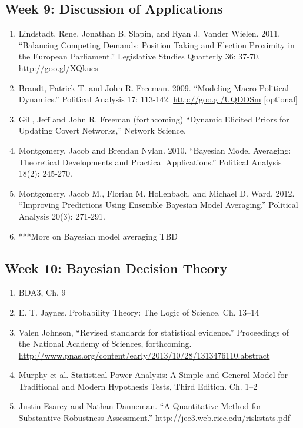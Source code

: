 \documentclass[11pt, leqno, fleqn]{article}
\begin{document}
\subsection*{Week 9: Discussion of Applications}
	\begin{enumerate}
	\item[] Lindstadt, Rene, Jonathan B. Slapin, and Ryan J. Vander Wielen. 2011. ``Balancing Competing Demands: Position Taking and Election Proximity in the European Parliament.'' Legislative Studies Quarterly 36: 37-70. \url{http://goo.gl/XQkucs}
	\item[] Brandt, Patrick T. and John R. Freeman. 2009. ``Modeling Macro-Political Dynamics.'' Political Analysis 17: 113-142. \url{http://goo.gl/UQDOSm} [optional]
 	\item[] Gill, Jeff and John R. Freeman (forthcoming) ``Dynamic Elicited Priors for
 Updating Covert Networks,'' Network Science.
	\item[] Montgomery, Jacob and Brendan Nylan. 2010. ``Bayesian Model Averaging:
 Theoretical Developments and Practical Applications.'' Political Analysis 18(2):
 245-270.
 	\item[] Montgomery, Jacob M., Florian M. Hollenbach, and Michael D. Ward. 2012.
``Improving Predictions Using Ensemble Bayesian Model Averaging.''
Political Analysis 20(3): 271-291.
	\item[] ***More on Bayesian model averaging TBD
	\end{enumerate}
\subsection*{Week 10: Bayesian Decision Theory}
	\begin{enumerate}
	\item[] BDA3, Ch. 9
	\item[] E. T. Jaynes. Probability Theory: The Logic of Science. Ch. 13--14
	\item[] Valen Johnson, ``Revised standards for statistical evidence.'' Proceedings of the National Academy of Sciences, forthcoming. \url{http://www.pnas.org/content/early/2013/10/28/1313476110.abstract}
	\item[] Murphy et al. Statistical Power Analysis: A Simple and General Model for Traditional and Modern Hypothesis Tests, Third Edition. Ch. 1--2
	\item[] Justin Esarey and Nathan Danneman. ``A Quantitative Method for Substantive Robustness Assessment.'' \url{http://jee3.web.rice.edu/riskstats.pdf}
	\end{enumerate}
\end{document}
